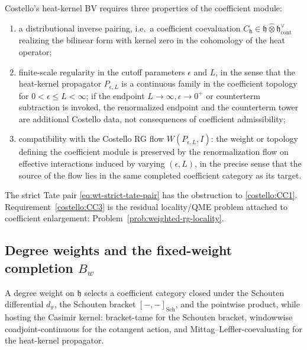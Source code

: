 \begin{rmk}
  Costello's heat-kernel BV requires three properties of the coefficient
  module:
  \begin{enumerate}[label=(C\arabic*)]
    \item\label{costello:CC1} a distributional inverse pairing,
      i.e.\ a coefficient coevaluation
      $C_{\mathfrak h}\in\mathfrak h\widehat\otimes
      \mathfrak h^\vee_{\mathrm{cont}}$ realizing the bilinear form
      with kernel zero in the cohomology of the heat operator;
    \item\label{costello:CC2} finite-scale regularity in the cutoff
      parameters $\epsilon$ and $L$, in the sense that the heat-kernel
      propagator $P_{\epsilon,L}$ is a continuous family in the
      coefficient topology for \(0<\epsilon\leq L<\infty\); if the
      endpoint \(L\to\infty,\epsilon\to0^+\) or counterterm subtraction
      is invoked, the renormalized endpoint and the counterterm tower
      are additional Costello data, not consequences of coefficient
      admissibility;
    \item\label{costello:CC3} compatibility with the Costello RG flow
      $W(P_{\epsilon,L},I)$: the weight or topology defining the
      coefficient module is preserved by the renormalization flow on
      effective interactions induced by varying $(\epsilon,L)$, in the
      precise sense that the source of the flow lies in the same
      completed coefficient category as its target.
  \end{enumerate}
  The strict Tate pair \eqref{eq:wt-strict-tate-pair} has the
  obstruction to \ref{costello:CC1}.  Requirement~\ref{costello:CC3} is
  the residual locality/QME problem attached to coefficient enlargement:
  Problem~\ref{prob:weighted-rg-locality}.
\end{rmk}

\subsection*{Degree weights and the fixed-weight completion \(B_w\)}

A degree weight on $\mathfrak h$ selects a coefficient category closed
under the Schouten differential $d_\pi$, the Schouten bracket
$[-,-]_{\mathrm{Sch}}$, and the pointwise product, while hosting the
Casimir kernel: bracket-tame for the Schouten bracket, windowwise
coadjoint-continuous for the cotangent action, and
Mittag--Leffler-coevaluating for the heat-kernel propagator.

